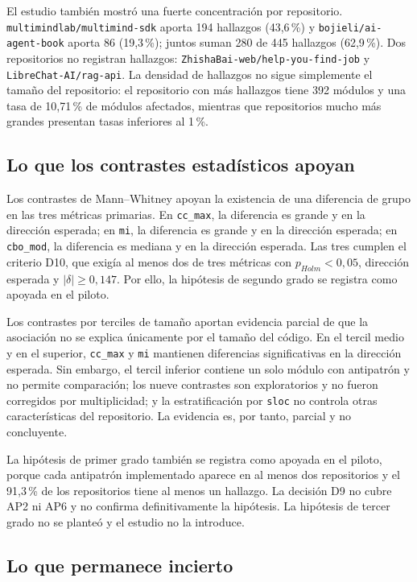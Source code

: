 El estudio también mostró una fuerte concentración por repositorio. \texttt{multimindlab/multimind-sdk} aporta 194 hallazgos (43,6\,\%) y \texttt{bojieli/ai-agent-book} aporta 86 (19,3\,\%); juntos suman 280 de 445 hallazgos (62,9\,\%). Dos repositorios no registran hallazgos: \texttt{ZhishaBai-web/help-you-find-job} y \texttt{LibreChat-AI/rag-api}. La densidad de hallazgos no sigue simplemente el tamaño del repositorio: el repositorio con más hallazgos tiene 392 módulos y una tasa de 10,71\,\% de módulos afectados, mientras que repositorios mucho más grandes presentan tasas inferiores al 1\,\%.

\subsection{Lo que los contrastes estadísticos apoyan}

Los contrastes de Mann--Whitney apoyan la existencia de una diferencia de grupo en las tres métricas primarias. En \texttt{cc\_max}, la diferencia es grande y en la dirección esperada; en \texttt{mi}, la diferencia es grande y en la dirección esperada; en \texttt{cbo\_mod}, la diferencia es mediana y en la dirección esperada. Las tres cumplen el criterio D10, que exigía al menos dos de tres métricas con $p_{Holm}<0{,}05$, dirección esperada y $|\delta|\geq0{,}147$. Por ello, la hipótesis de segundo grado se registra como apoyada en el piloto.

Los contrastes por terciles de tamaño aportan evidencia parcial de que la asociación no se explica únicamente por el tamaño del código. En el tercil medio y en el superior, \texttt{cc\_max} y \texttt{mi} mantienen diferencias significativas en la dirección esperada. Sin embargo, el tercil inferior contiene un solo módulo con antipatrón y no permite comparación; los nueve contrastes son exploratorios y no fueron corregidos por multiplicidad; y la estratificación por \texttt{sloc} no controla otras características del repositorio. La evidencia es, por tanto, parcial y no concluyente.

La hipótesis de primer grado también se registra como apoyada en el piloto, porque cada antipatrón implementado aparece en al menos dos repositorios y el 91,3\,\% de los repositorios tiene al menos un hallazgo. La decisión D9 no cubre AP2 ni AP6 y no confirma definitivamente la hipótesis. La hipótesis de tercer grado no se planteó y el estudio no la introduce.

\subsection{Lo que permanece incierto}


